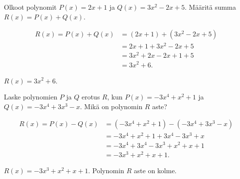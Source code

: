\begin{esimerkki}
    Olkoot polynomit $P(x)=2x+1$ ja $Q(x)=3x^2-2x+5$. Määritä summa $R(x)=P(x)+Q(x)$.
    \begin{esimratk}
        \begin{align*}
            R(x) = P(x)+Q(x) &= (2x+1)+(3x^2-2x+5) \\
                             &= 2x+1+3x^2-2x+5 \\
                             &= 3x^2+2x-2x+1+5 \\
                             &= 3x^2+6.
        \end{align*}
    \end{esimratk}
    \begin{esimvast}
        $R(x) = 3x^2+6$.
    \end{esimvast}
\end{esimerkki}

\begin{esimerkki}
    Laske polynomien $P$ ja $Q$ erotus $R$, kun $P(x)=-3x^4+x^2+1$ ja $Q(x)=-3x^4+3x^3-x$.
    Mikä on polynomin $R$ aste?
   \begin{esimratk}
        \begin{align*}
            R(x) = P(x)-Q(x) &= (-3x^4+x^2+1)-(-3x^4+3x^3-x) \\
                             &= -3x^4+x^2+1+3x^4-3x^3+x \\
                             &= -3x^4+3x^4-3x^3+x^2+x+1 \\
                             &= -3x^3+x^2+x+1.
        \end{align*}
    \end{esimratk}
    \begin{esimvast}
        $R(x) = -3x^3+x^2+x+1$. Polynomin $R$ aste on kolme.
    \end{esimvast}
\end{esimerkki}

